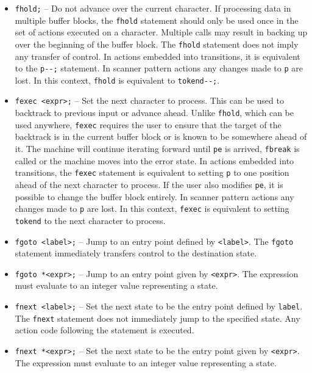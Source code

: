 \documentclass[letterpaper,11pt,oneside]{book}
\begin{document}
\begin{itemize}

\item \verb|fhold;| -- Do not advance over the current character. If processing
data in multiple buffer blocks, the \verb|fhold| statement should only be used
once in the set of actions executed on a character.  Multiple calls may result
in backing up over the beginning of the buffer block. The \verb|fhold|
statement does not imply any transfer of control. In actions embedded into
transitions, it is equivalent to the \verb|p--;| statement. In scanner pattern
actions any changes made to \verb|p| are lost. In this context, \verb|fhold| is
equivalent to \verb|tokend--;|.

\item \verb|fexec <expr>;| -- Set the next character to process. This can be
used to backtrack to previous input or advance ahead.
Unlike \verb|fhold|, which can be used
anywhere, \verb|fexec| requires the user to ensure that the target of the
backtrack is in the current buffer block or is known to be somewhere ahead of
it. The machine will continue iterating forward until \verb|pe| is arrived,
\verb|fbreak| is called or the machine moves into the error state. In actions
embedded into transitions, the \verb|fexec| statement is equivalent to setting
\verb|p| to one position ahead of the next character to process.  If the user
also modifies \verb|pe|, it is possible to change the buffer block entirely.
In scanner pattern actions any changes made to \verb|p| are lost. In this
context, \verb|fexec| is equivalent to setting \verb|tokend| to the next
character to process.

\item \verb|fgoto <label>;| -- Jump to an entry point defined by
\verb|<label>|.  The \verb|fgoto| statement immediately transfers control to
the destination state.

\item \verb|fgoto *<expr>;| -- Jump to an entry point given by \verb|<expr>|.
The expression must evaluate to an integer value representing a state.

\item \verb|fnext <label>;| -- Set the next state to be the entry point defined
by \verb|label|.  The \verb|fnext| statement does not immediately jump to the
specified state. Any action code following the statement is executed.

\item \verb|fnext *<expr>;| -- Set the next state to be the entry point given
by \verb|<expr>|. The expression must evaluate to an integer value representing
a state.


\end{itemize}
\end{document}
